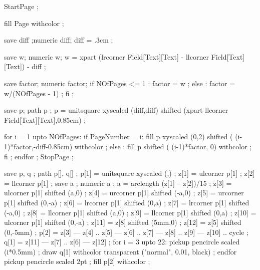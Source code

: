 

StartPage ;

fill Page withcolor  ;

save diff ;numeric diff; 
diff = .3cm ;

save w; numeric w; 
w = xpart (lrcorner Field[Text][Text] - llcorner Field[Text][Text]) - diff ;

save factor; numeric factor; 
if NOfPages <= 1 :
  factor = w ;
else :
  factor = w/(NOfPages - 1) ;
fi ;

save p; path p ;
p = unitsquare xyscaled (diff,diff) 
               shifted (xpart llcorner Field[Text][Text],0.85cm) ;

for i = 1 upto NOfPages:
  if PageNumber = i:
    fill p xyscaled (0,2) shifted ( (i-1)*factor,-diff-0.85cm) 
         withcolor  ;
  else :
    fill p shifted ( (i-1)*factor, 0) 
         withcolor  ;
  fi ;
endfor ;
StopPage ;
\stopuseMPgraphic 





\setupTitle
  [color=simpleslides:contrastcolor]


\setupSlideTitle
  [\c!color={simpleslides:contrastcolor},
   \c!alternative=layer,
   \c!align=\v!center,
   \c!width=\textwidth,
   \c!height=3cm,
   \c!after=]


save p, q ; path p[], q[] ;
p[1] = unitsquare xyscaled (\overlaywidth,\overlayheight) ;
z[1] = ulcorner p[1] ;
z[2] = llcorner p[1] ;
save a ; numeric a ;
a = arclength (z[1] -- z[2])/15 ;
z[3] = ulcorner p[1] shifted (a,0) ;
z[4] = urcorner p[1] shifted (-a,0) ;
z[5] = urcorner p[1] shifted (0,-a) ;
z[6] = lrcorner p[1] shifted (0,a) ;
z[7] = lrcorner p[1] shifted (-a,0) ;
z[8] = llcorner p[1] shifted (a,0) ;
z[9] = llcorner p[1] shifted (0,a) ;
z[10] = ulcorner p[1] shifted (0,-a) ;
z[11] = z[8] shifted (5mm,0) ;
z[12] = z[5] shifted (0,-5mm) ;
p[2] = z[3] --- z[4] .. z[5] --- z[6]  .. z[7] --- z[8] .. z[9] --- z[10] .. cycle ;
q[1] = z[11] --- z[7] .. z[6] --- z[12] ;
for i = 3 upto 22:
	pickup pencircle scaled (i*0.5mm) ;
	draw q[1] withcolor transparent ("normal", 0.01, black) ;
endfor
pickup pencircle scaled 2pt ;
fill p[2] withcolor  ;
\stopuniqueMPgraphic


